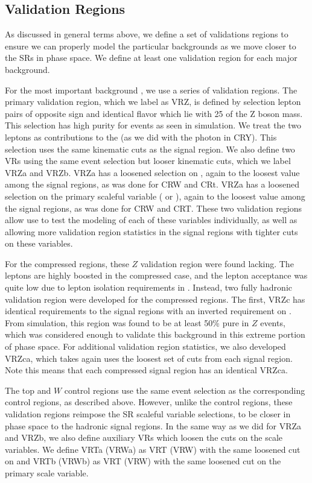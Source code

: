\subsection{Validation Regions}

As discussed in general terms above, we define a set of validations regions to ensure we can properly model the particular backgrounds as we move closer to the SRs in phase space.
We define at least one validation region for each major background.

For the most important background \Zvv, we use a series of validation regions.
The primary validation region, which we label as VRZ, is defined by selection lepton pairs of opposite sign and identical flavor which lie with 25 \GeV of the Z boson mass.
This selection has high purity for \Zll events as seen in simulation.
We treat the two leptons as contributions to the \met (as we did with the photon in CRY).
This selection uses the same kinematic cuts as the signal region.
We also define two VRs using the same event selection but looser kinematic cuts, which we label VRZa and VRZb.
VRZa has a loosened selection on , again to the loosest value among the signal regions, as was done for CRW and CRt.
VRZa has a loosened selection on the primary scaleful variable  ( or ), again to the loosest value among the signal regions, as was done for CRW and CRT.
These two validation regions allow use to test the modeling of each of these variables individually, as well as allowing more validation region statistics in the signal regions with tighter cuts on these variables.

For the compressed regions, these $Z$ validation region were found lacking.
The leptons are highly boosted in the compressed case, and the lepton acceptance was quite low due to lepton isolation requirements in \deltaR.
Instead, two fully hadronic validation region were developed for the compressed regions.
The first, VRZc has identical requirements to the signal regions with an inverted requirement on \dphiISR.
From simulation, this region was found to be at least 50\% pure in $Z$ events, which was considered enough to validate this background in this extreme portion of phase space.
For additional validation region statistics, we also developed VRZca, which takes again uses the loosest set of cuts from each signal region.
Note this means that each compressed signal region has an identical VRZca.

The top and $W$ control regions use the same event selection as the corresponding control regions, as described above.
However, unlike the control regions, these validation regions reimpose the SR scaleful variable selections, to be closer in phase space to the hadronic signal regions.
In the same way as we did for VRZa and VRZb, we also define auxiliary VRs which loosen the cuts on the scale variables.
We define VRTa (VRWa) as VRT (VRW) with the same loosened cut on  and VRTb (VRWb) as VRT (VRW) with the same loosened cut on the primary scale variable.

